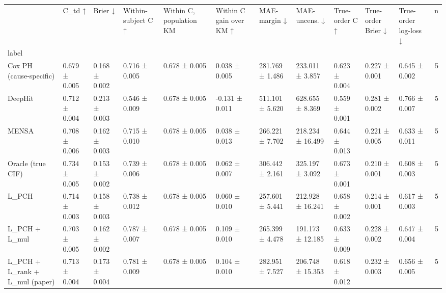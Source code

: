 \begin{tabular}{lllllllllllr}
\toprule
 & C\_td ↑ & Brier ↓ & Within-subject C ↑ & Within C, population KM & Within C gain over KM ↑ & MAE-margin ↓ & MAE-uncens. ↓ & True-order C ↑ & True-order Brier ↓ & True-order log-loss ↓ & n \\
label &  &  &  &  &  &  &  &  &  &  &  \\
\midrule
Cox PH (cause-specific) & 0.679 ± 0.005 & 0.168 ± 0.002 & 0.716 ± 0.005 & 0.678 ± 0.005 & 0.038 ± 0.005 & 281.769 ± 1.486 & 233.011 ± 3.857 & 0.623 ± 0.004 & 0.227 ± 0.001 & 0.645 ± 0.002 & 5 \\
DeepHit & 0.712 ± 0.004 & 0.213 ± 0.003 & 0.546 ± 0.009 & 0.678 ± 0.005 & -0.131 ± 0.011 & 511.101 ± 5.620 & 628.655 ± 8.369 & 0.559 ± 0.001 & 0.281 ± 0.002 & 0.766 ± 0.007 & 5 \\
MENSA & 0.708 ± 0.006 & 0.162 ± 0.003 & 0.715 ± 0.010 & 0.678 ± 0.005 & 0.038 ± 0.013 & 266.221 ± 7.702 & 218.234 ± 16.499 & 0.644 ± 0.013 & 0.221 ± 0.005 & 0.633 ± 0.011 & 5 \\
Oracle (true CIF) & 0.734 ± 0.005 & 0.153 ± 0.002 & 0.739 ± 0.006 & 0.678 ± 0.005 & 0.062 ± 0.007 & 306.442 ± 2.161 & 325.197 ± 3.092 & 0.673 ± 0.001 & 0.210 ± 0.001 & 0.608 ± 0.003 & 5 \\
L\_PCH & 0.714 ± 0.003 & 0.158 ± 0.003 & 0.738 ± 0.012 & 0.678 ± 0.005 & 0.060 ± 0.010 & 257.601 ± 5.441 & 212.928 ± 16.241 & 0.658 ± 0.002 & 0.214 ± 0.001 & 0.617 ± 0.003 & 5 \\
L\_PCH + L\_mul & 0.703 ± 0.005 & 0.162 ± 0.002 & 0.787 ± 0.007 & 0.678 ± 0.005 & 0.109 ± 0.010 & 265.399 ± 4.478 & 191.173 ± 12.185 & 0.633 ± 0.009 & 0.228 ± 0.002 & 0.647 ± 0.004 & 5 \\
L\_PCH + L\_rank + L\_mul (paper) & 0.713 ± 0.004 & 0.173 ± 0.004 & 0.781 ± 0.009 & 0.678 ± 0.005 & 0.104 ± 0.010 & 282.951 ± 7.527 & 206.748 ± 15.353 & 0.618 ± 0.012 & 0.232 ± 0.003 & 0.656 ± 0.005 & 5 \\
\bottomrule
\end{tabular}

